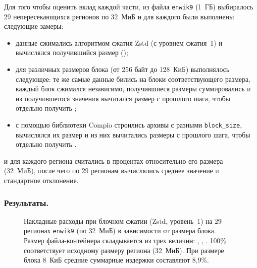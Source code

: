 Для того чтобы оценить вклад каждой части, из файла \texttt{enwik9} (1~ГБ) выбиралось 29 непересекающихся регионов по 32~МиБ и для каждого были выполнены следующие замеры:

\begin{itemize}
    \item данные сжимались алгоритмом сжатия Zstd (с уровнем сжатия~1) и вычислялся получившийся размер ();
    \item для различных размеров блока (от 256 байт до 128~КиБ) выполнялось следующее: те же самые данные бились на блоки соответствующего размера, каждый блок сжимался независимо, получившиеся размеры суммировались и из получившегося значения вычитался размер с прошлого шага, чтобы отдельно получить ;
    \item с помощью библиотеки Compio строились архивы с разными \texttt{block\_size}, вычислялся их размер и из них вычитались размеры с прошлого шага, чтобы отдельно получить .
\end{itemize}

 и  для каждого региона считались в процентах относительно его размера (32~МиБ), после чего по 29 регионам вычислялись среднее значение и стандартное отклонение.

\subsubsection{Результаты.}

\begin{figure}[h]
    \centering
    
    \caption{Накладные расходы при блочном сжатии (Zstd, уровень~1) на 29 регионах \texttt{enwik9} (по 32~МиБ) в зависимости от размера блока. Размер файла-контейнера складывается из трех величин: , , . 100\% соответствует исходному размеру региона (32~МиБ). При размере блока 8~КиБ средние суммарные издержки составляют 8,9\%.}
    \label{fig:overhead}
\end{figure}

